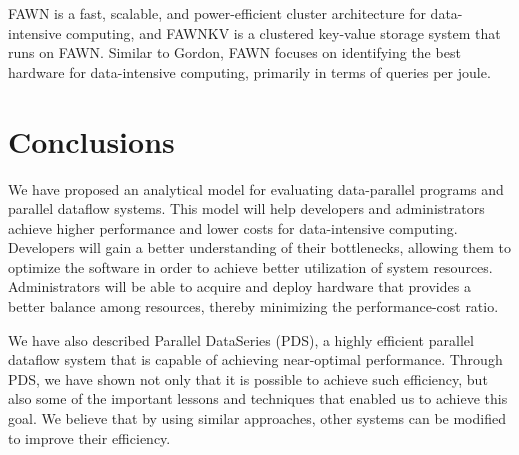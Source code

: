 \documentclass{acm_proc_article-sp}
\begin{document}
FAWN \cite{fawn} is a fast, scalable, and power-efficient cluster architecture
for data-intensive computing, and FAWNKV is a clustered key-value
storage system that runs on FAWN. Similar to Gordon, FAWN focuses on identifying
the best hardware for data-intensive computing, primarily in terms of queries
per joule.

\section{Conclusions}


We have proposed an analytical model for evaluating data-parallel programs and
parallel dataflow systems. This model will help developers and administrators
achieve higher performance and lower costs for data-intensive computing.
Developers will gain a better understanding of their bottlenecks, allowing them
to optimize the software in order to achieve better utilization of system
resources. Administrators will be able to acquire and deploy hardware that
provides a better balance among resources, thereby minimizing the
performance-cost ratio.

We have also described Parallel DataSeries (PDS), a
highly efficient parallel dataflow system that is capable of achieving
near-optimal performance. Through PDS, we have shown not only that it is
possible to achieve such efficiency, but also some of the important lessons and
techniques that enabled us to achieve this goal. We believe that by using
similar approaches, other systems can be modified to improve their efficiency.



%

%

\balancecolumns
\end{document}
